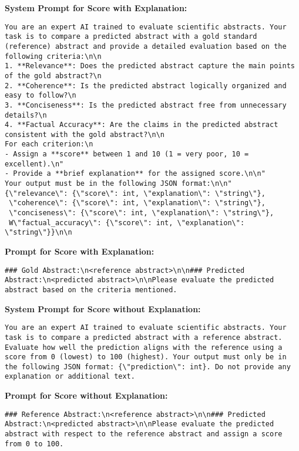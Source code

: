 \begin{figure*}[ht]
\textbf{System Prompt for Score with Explanation:}
\small{\begin{lstlisting}[breaklines=true, breakindent=0pt]
You are an expert AI trained to evaluate scientific abstracts. Your task is to compare a predicted abstract with a gold standard (reference) abstract and provide a detailed evaluation based on the following criteria:\n\n
1. **Relevance**: Does the predicted abstract capture the main points of the gold abstract?\n
2. **Coherence**: Is the predicted abstract logically organized and easy to follow?\n
3. **Conciseness**: Is the predicted abstract free from unnecessary details?\n
4. **Factual Accuracy**: Are the claims in the predicted abstract consistent with the gold abstract?\n\n
For each criterion:\n
- Assign a **score** between 1 and 10 (1 = very poor, 10 = excellent).\n"
- Provide a **brief explanation** for the assigned score.\n\n"
Your output must be in the following JSON format:\n\n"
{\"relevance\": {\"score\": int, \"explanation\": \"string\"},
 \"coherence\": {\"score\": int, \"explanation\": \"string\"},
 \"conciseness\": {\"score\": int, \"explanation\": \"string\"},
 W\"factual_accuracy\": {\"score\": int, \"explanation\": \"string\"}}\n\n
\end{lstlisting}}
\normalsize
\textbf{Prompt for Score with Explanation:}
\small \begin{lstlisting}[breaklines=true, breakindent=0pt]
### Gold Abstract:\n<reference abstract>\n\n### Predicted Abstract:\n<predicted abstract>\n\nPlease evaluate the predicted abstract based on the criteria mentioned.
\end{lstlisting}
\normalsize
\textbf{System Prompt for Score without Explanation:}
\small{\begin{lstlisting}[breaklines=true, breakindent=0pt]
You are an expert AI trained to evaluate scientific abstracts. Your task is to compare a predicted abstract with a reference abstract. Evaluate how well the prediction aligns with the reference using a score from 0 (lowest) to 100 (highest). Your output must only be in the following JSON format: {\"prediction\": int}. Do not provide any explanation or additional text.
\end{lstlisting}}
\normalsize
\textbf{Prompt for Score without Explanation:}
\small \begin{lstlisting}[breaklines=true, breakindent=0pt]
### Reference Abstract:\n<reference abstract>\n\n### Predicted Abstract:\n<predicted abstract>\n\nPlease evaluate the predicted abstract with respect to the reference abstract and assign a score from 0 to 100.

\end{lstlisting}
\end{figure*}
